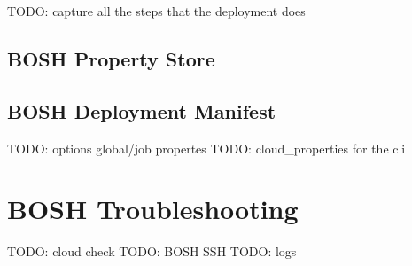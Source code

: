 TODO: capture all the steps that the deployment does

\section{BOSH Property Store}
\label{boshpropertystore}

\section{BOSH Deployment Manifest}
\label{boshdeploymentmanifest}

TODO: options global\slash job propertes
TODO: cloud\_properties for the cli

\chapter{BOSH Troubleshooting}
\label{boshtroubleshooting}

TODO: cloud check
TODO: BOSH SSH
TODO: logs




